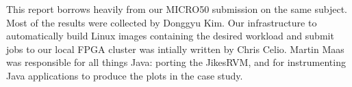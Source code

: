 This report borrows heavily from our MICRO50 submission on the same subject.
Most of the results were collected by Donggyu Kim. Our infrastructure to
automatically build Linux images containing the desired workload and submit
jobs to our local FPGA cluster was intially written by Chris Celio. Martin Maas
was responsible for all things Java: porting the JikesRVM, and for
instrumenting Java applications to produce the plots in the case study.



